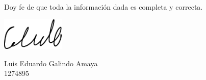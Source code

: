 \documentclass[12pt]{article}
\begin{document}
\begin{center}
Doy fe de que toda la información dada es  completa y correcta. \\
\begin{center}
\includegraphics[width=3cm]{../includes/firma.png}
\end{center}
Luis Eduardo Galindo Amaya \\
1274895
\end{center}
\end{document}
